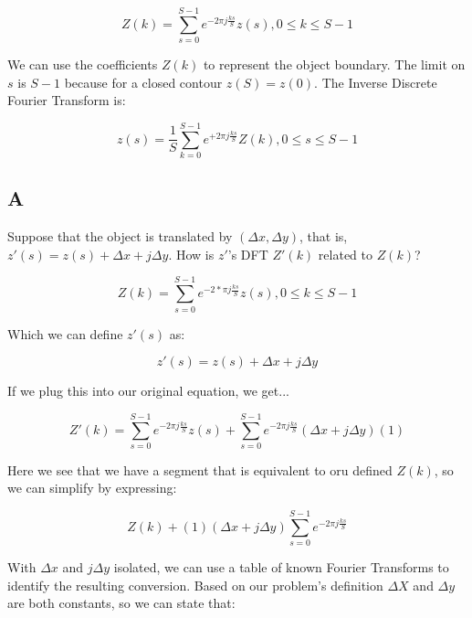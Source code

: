 \documentclass{article}
\begin{document}
\begin{equation}
    Z(k) = \sum^{S-1}_{s=0} e^{-2\pi j \frac{ks}{S}} z(s), 0\leq k \leq S-1
\end{equation}

We can use the coefficients $Z(k)$ to represent the object boundary. The limit on $s$ is $S-1$ because for a closed contour $z(S)=z(0)$. The Inverse Discrete Fourier Transform is:

\begin{equation}
    z(s) = \frac{1}{S} \sum_{k=0}^{S-1} e^{+2\pi j \frac{ks}{S}} Z(k), 0 \leq s \leq S-1
\end{equation}

\subsection*{A}

Suppose that the object is translated by $(\Delta x, \Delta y)$, that is, $z'(s)=z(s) + \Delta x + j \Delta y$. How is $z'$'s DFT $Z'(k)$ related to $Z(k)$?


\begin{equation}
    Z(k) = \sum^{S-1}_{s=0} e^{-2*\pi j \frac{ks}{S}} z(s), 0\leq k \leq S-1
\end{equation}

\noindent Which we can define $z'(s)$ as:

\begin{equation}
    z'(s) = z(s) + \Delta x + j \Delta y
\end{equation}

\noindent If we plug this into our original equation, we get...

\begin{equation}
    Z'(k) = \sum_{s=0}^{S-1} e^{-2\pi j \frac{ks}{S}}z(s) + \sum_{s=0}^{S-1} e^{-2\pi j \frac{ks}{S}} (\Delta x + j \Delta y) (1)
\end{equation}

\noindent Here we see that we have a segment that is equivalent to oru defined $Z(k)$, so we can simplify by expressing:

\begin{equation}
    Z(k) + (1) (\Delta x + j \Delta y) \sum_{s=0}^{S-1} e^{-2\pi j \frac{ks}{S}}
\end{equation}

\noindent With $\Delta x$ and $j \Delta y$ isolated, we can use a table of known Fourier Transforms to identify the resulting conversion. Based on our problem's definition $\Delta X$ and $\Delta y$ are both constants, so we can state that:
\end{document}
